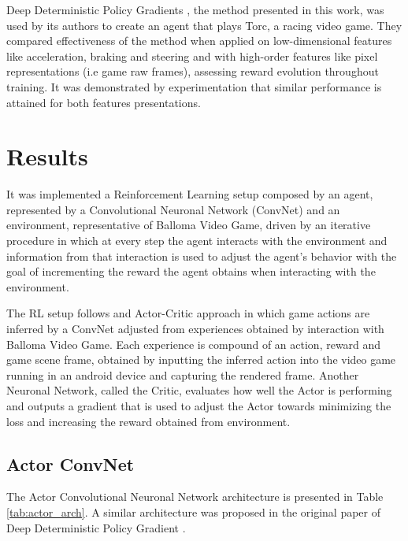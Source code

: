 \documentclass[peerreview,onecolumn]{IEEEtran}
\begin{document}
	  Deep Deterministic Policy Gradients \cite{ddpg_2015}, the method presented in this work, was used by its authors to create an agent that plays Torc, a racing video game. They compared effectiveness of the method when applied on low-dimensional features like acceleration, braking and steering and with high-order features like pixel representations (i.e game raw frames), assessing reward evolution throughout training. It was demonstrated by experimentation that similar performance is attained for both features presentations.
	  
	  \section{Results}
	  
	  It was implemented a Reinforcement Learning setup composed by an agent, represented by a Convolutional Neuronal Network (ConvNet) and an environment, representative of Balloma Video Game, driven by an iterative procedure in which at every step the agent interacts with the environment and information from that interaction is used to adjust the agent's behavior with the goal of incrementing the reward the agent obtains when interacting with the environment. 
	  
	 The RL setup follows and Actor-Critic approach in which game actions are inferred by a ConvNet adjusted from experiences obtained by interaction with Balloma Video Game. Each experience is compound of an action, reward and game scene frame, obtained by inputting the inferred action into the video game running in an android device and capturing the rendered frame. Another Neuronal Network, called the Critic, evaluates how well the Actor is performing and outputs a gradient that is used to adjust the Actor towards minimizing the loss and increasing the reward obtained from environment.
	 
	 \subsection{Actor ConvNet}
	 
	 The Actor Convolutional Neuronal Network architecture is presented in Table \ref{tab:actor_arch}. A similar architecture was proposed in the original paper of Deep Deterministic Policy Gradient \cite{ddpg_2015}. 
	 
\end{document}
